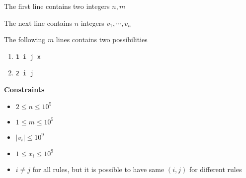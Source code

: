 The first line contains two integers $n, m$

The next line contains $n$ integers $v_1, \cdots, v_n$

The following $m$ lines contains two possibilities
\begin{enumerate}
    \item \texttt{1 i j x}
    \item \texttt{2 i j}
\end{enumerate}

\textbf{Constraints}
\begin{itemize}
\item $2 \le n \le 10^5$
\item $1 \le m \le 10^5$
\item $|v_i| \le 10^9$
\item $1 \le x_i \le 10^9$
\item $i \ne j$ for all rules, but it is possible to have same $(i,j)$ for different rules
\end{itemize}
